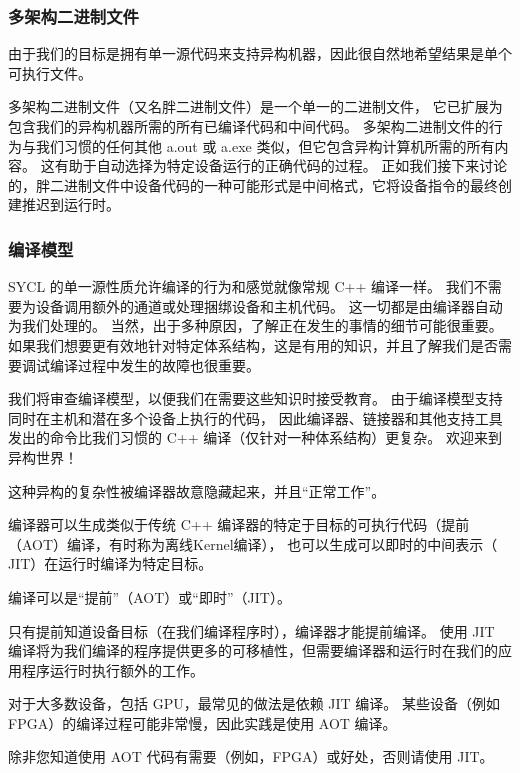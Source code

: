 \subsubsection{多架构二进制文件}
由于我们的目标是拥有单一源代码来支持异构机器，因此很自然地希望结果是单个可执行文件。

多架构二进制文件（又名胖二进制文件）是一个单一的二进制文件，
它已扩展为包含我们的异构机器所需的所有已编译代码和中间代码。 
多架构二进制文件的行为与我们习惯的任何其他 a.out 或 a.exe 类似，但它包含异构计算机所需的所有内容。 
这有助于自动选择为特定设备运行的正确代码的过程。 
正如我们接下来讨论的，胖二进制文件中设备代码的一种可能形式是中间格式，它将设备指令的最终创建推迟到运行时。

\subsubsection{编译模型}
SYCL 的单一源性质允许编译的行为和感觉就像常规 C++ 编译一样。 
我们不需要为设备调用额外的通道或处理捆绑设备和主机代码。 这一切都是由编译器自动为我们处理的。 
当然，出于多种原因，了解正在发生的事情的细节可能很重要。 
如果我们想要更有效地针对特定体系结构，这是有用的知识，并且了解我们是否需要调试编译过程中发生的故障也很重要。

我们将审查编译模型，以便我们在需要这些知识时接受教育。 
由于编译模型支持同时在主机和潜在多个设备上执行的代码，
因此编译器、链接器和其他支持工具发出的命令比我们习惯的 C++ 编译（仅针对一种体系结构）更复杂。 欢迎来到异构世界！

这种异构的复杂性被编译器故意隐藏起来，并且“正常工作”。

编译器可以生成类似于传统 C++ 编译器的特定于目标的可执行代码（提前（AOT）编译，有时称为离线Kernel编译），
也可以生成可以即时的中间表示（ JIT）在运行时编译为特定目标。

\begin{remark}
	编译可以是“提前”（AOT）或“即时”（JIT）。
\end{remark}

只有提前知道设备目标（在我们编译程序时），编译器才能提前编译。 
使用 JIT 编译将为我们编译的程序提供更多的可移植性，但需要编译器和运行时在我们的应用程序运行时执行额外的工作。

对于大多数设备，包括 GPU，最常见的做法是依赖 JIT 编译。 
某些设备（例如 FPGA）的编译过程可能非常慢，因此实践是使用 AOT 编译。

\begin{remark}
	除非您知道使用 AOT 代码有需要（例如，FPGA）或好处，否则请使用 JIT。
\end{remark}

